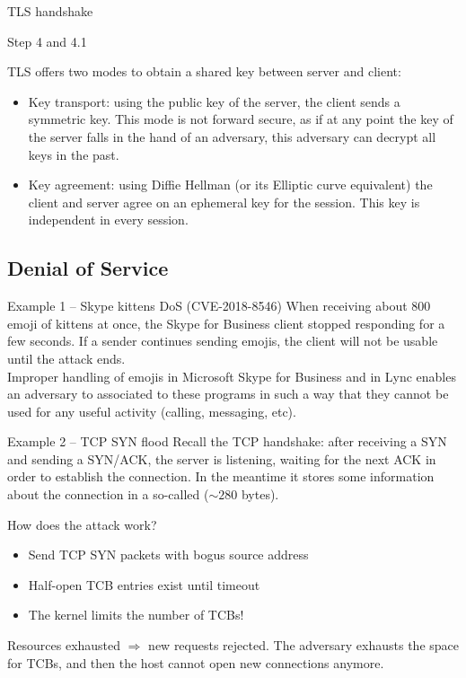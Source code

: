 \begin{parag}{TLS handshake}
\begin{subparag}{Step 4 and 4.1}
	\end{subparag}
	TLS offers two modes to obtain a shared key between server and client:
	\begin{itemize}
	\item Key transport: using the public key of the server, the client sends a symmetric key. This mode is not forward secure, as if at any point the key of the server falls in the hand of an adversary, this adversary can decrypt all keys in the past.
	\item  Key agreement: using Diffie Hellman (or its Elliptic curve equivalent) the client and server agree on an ephemeral key for the session. This key is independent in every session.
	\end{itemize}
\end{parag}


\subsection{Denial of Service}
\begin{parag}{Example 1 -- Skype kittens DoS (CVE-2018-8546)}
    When receiving about 800 emoji of kittens at once, the Skype for Business client stopped responding for a few seconds. If a sender continues sending emojis, the client will not be usable until the attack ends.\\
	Improper handling of emojis in Microsoft Skype for Business and in Lync enables an adversary to  associated to these programs in such a way that they cannot be used for any useful activity (calling, messaging, etc).
\end{parag}

\begin{parag}{Example 2 -- TCP SYN flood}
    Recall the TCP handshake: after receiving a SYN and sending a SYN/ACK, the server is listening, waiting for the next ACK in order to establish the connection. In the meantime it stores some information about the connection in a so-called  ($\sim 280$ bytes).
	\begin{subparag}{How does the attack work?}
		\begin{itemize}
		    \item Send TCP SYN packets with bogus source address
		    \item Half-open TCB entries exist until timeout
		    \item The kernel limits the number of TCBs!
		\end{itemize}
		Resources exhausted $\Rightarrow$ new requests rejected. The adversary exhausts the space for TCBs, and then the host cannot open new connections anymore.
	\end{subparag}
\end{parag}

